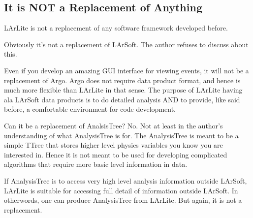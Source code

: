 \subsection{It is NOT a Replacement of Anything}
LArLite is not a replacement of any software framework developed before. 

Obviously it's not a replacement of LArSoft.
The author refuses to discuss about this. 

Even if you develop an amazing GUI interface for viewing events, it will not be a replacement of {\ttfamily Argo}.
{\ttfamily Argo} does not require data product format, and hence is much more flexible than LArLite in that sense.
The purpose of LArLite having ala LArSoft data products is to do detailed analysis AND to provide, like said before,
a comfortable environment for code development.

Can it be a replacement of {\ttfamily AnalsisTree}? 
No. Not at least in the author's understanding of what {\ttfamily AnalysisTree} is for.
The {\ttfamily AnalysisTree} is meant to be a simple {\ttfamily TTree} that stores higher level physics variables you know you are interested in. Hence it is not meant to be used for developing complicated algorithms that require more basic level information in data.

If {\ttfamily AnalysisTree} is to access very high level analysis information outside LArSoft, LArLite is suitable for accessing full detail of information outside LArSoft. In otherwords, one can produce {\ttfamily AnalysisTree} from LArLite. But again, it is not a replacement.







